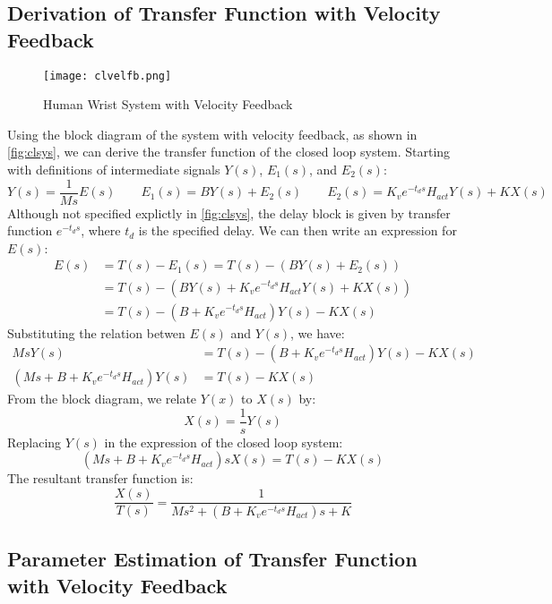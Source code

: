 \documentclass[11pt,a4paper]{article}
\begin{document}
\subsection{Derivation of Transfer Function with Velocity Feedback}
\begin{figure}
    \centering
    \texttt{[image: clvelfb.png]}
    \caption{Human Wrist System with Velocity Feedback}
    \label{fig:clsys}
\end{figure}
Using the block diagram of the system with velocity feedback, as shown in
\autoref{fig:clsys}, we can derive the transfer function of the closed loop
system. Starting with definitions of intermediate signals $Y(s)$, $E_1(s)$, and
$E_2(s)$:
\begin{equation*}
    Y(s) = \frac{1}{Ms}E(s) \qquad E_1(s) = BY(s) + E_2(s) \qquad
    E_2(s) = K_v e^{-t_d s} H_{act} Y(s) + KX(s)
\end{equation*}
Although not specified explictly in \autoref{fig:clsys}, the delay block is
given by transfer function $ e^{-t_d s} $, where $t_d$ is the specified delay.
We can then write an expression for $E(s)$:
\begin{align*}
    E(s) &= T(s) - E_1(s) = T(s) - (BY(s) + E_2(s)) \\
         &= T(s) - (BY(s) + K_v e^{-t_d s} H_{act} Y(s) + KX(s)) \\
         &= T(s) - (B + K_v e^{-t_d s} H_{act}) Y(s) - KX(s)
\end{align*}
Substituting the relation betwen $E(s)$ and $Y(s)$, we have:
\begin{align*}
    Ms Y(s) &= T(s) - (B + K_v e^{-t_d s} H_{act}) Y(s) - KX(s) \\
    (Ms + B + K_v e^{-t_d s} H_{act}) Y(s) &= T(s) - KX(s)
\end{align*}
From the block diagram, we relate $Y(x)$ to $X(s)$ by:
\begin{equation*}
    X(s) = \frac{1}{s} Y(s)
\end{equation*}
Replacing $Y(s)$ in the expression of the closed loop system:
\begin{equation*}
    (Ms + B + K_v e^{-t_d s} H_{act}) s X(s) = T(s) - KX(s)
\end{equation*}
The resultant transfer function is:
\begin{equation*}
    \frac{X(s)}{T(s)} = \frac{1}{Ms^2 + (B + K_v e^{-t_d s} H_{act}) s  + K}
\end{equation*}

\subsection{Parameter Estimation of Transfer Function with Velocity Feedback}
\end{document}
